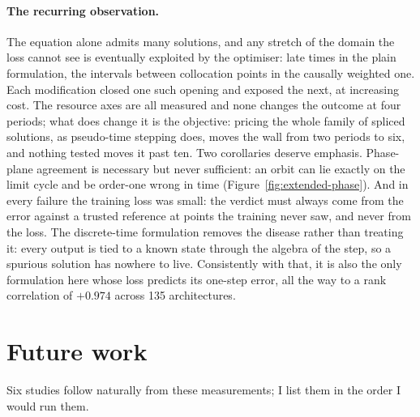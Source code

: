 \documentclass[11pt,a4paper]{article}
\begin{document}
\paragraph{The recurring observation.}
The equation alone admits many solutions, and any stretch of the domain the
loss cannot see is eventually exploited by the optimiser: late times in the
plain formulation, the intervals between collocation points in the causally
weighted one. Each modification closed one such opening and exposed the
next, at increasing cost. The resource axes are all measured and none changes the outcome at four periods; what does change it is the objective: pricing the whole family of spliced solutions, as pseudo-time stepping does, moves the wall from two periods to six, and nothing tested moves it past ten.
Two corollaries deserve emphasis. Phase-plane
agreement is necessary but never sufficient: an orbit can lie exactly on
the limit cycle and be order-one wrong in time
(Figure~\ref{fig:extended-phase}). And in every failure the training loss
was small: the verdict must always come from the error against a trusted
reference at points the training never saw, and never from the loss. The
discrete-time formulation removes the disease rather than treating it:
every output is tied to a known state through the algebra of the step, so
a spurious solution has nowhere to live. Consistently with that, it is
also the only formulation here whose loss predicts its one-step error, all
the way to a rank correlation of $+0.974$ across 135 architectures.

\section{Future work}
\label{sec:future}

Six studies follow naturally from these measurements; I list them in the
order I would run them.
\end{document}
